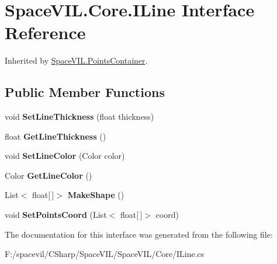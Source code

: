 \hypertarget{interface_space_v_i_l_1_1_core_1_1_i_line}{}\section{Space\+V\+I\+L.\+Core.\+I\+Line Interface Reference}
\label{interface_space_v_i_l_1_1_core_1_1_i_line}


Inherited by \mbox{\hyperlink{class_space_v_i_l_1_1_points_container}{Space\+V\+I\+L.\+Points\+Container}}.

\subsection*{Public Member Functions}
\begin{DoxyCompactItemize}
\item 
\mbox{\label{interface_space_v_i_l_1_1_core_1_1_i_line_acb10ebef121cdc2ba63aaf088bdd6529}} 
void {\bfseries Set\+Line\+Thickness} (float thickness)
\item 
\mbox{\label{interface_space_v_i_l_1_1_core_1_1_i_line_a4ca59e6fab1ab21ed067777f9c7394bc}} 
float {\bfseries Get\+Line\+Thickness} ()
\item 
\mbox{\label{interface_space_v_i_l_1_1_core_1_1_i_line_a01fbf6f699cbecf9ab32322c743351f9}} 
void {\bfseries Set\+Line\+Color} (Color color)
\item 
\mbox{\label{interface_space_v_i_l_1_1_core_1_1_i_line_aa8bf019f696af52bc2c37cd48b314d74}} 
Color {\bfseries Get\+Line\+Color} ()
\item 
\mbox{\label{interface_space_v_i_l_1_1_core_1_1_i_line_a5ee2b334c5452eeda1b57c63605386cf}} 
List$<$ float\mbox{[}$\,$\mbox{]}$>$ {\bfseries Make\+Shape} ()
\item 
\mbox{\label{interface_space_v_i_l_1_1_core_1_1_i_line_afbf7ee3a7286492b8f3833fa2dc3f886}} 
void {\bfseries Set\+Points\+Coord} (List$<$ float\mbox{[}$\,$\mbox{]}$>$ coord)
\end{DoxyCompactItemize}


The documentation for this interface was generated from the following file\+:\begin{DoxyCompactItemize}
\item 
F\+:/spacevil/\+C\+Sharp/\+Space\+V\+I\+L/\+Space\+V\+I\+L/\+Core/I\+Line.\+cs\end{DoxyCompactItemize}
